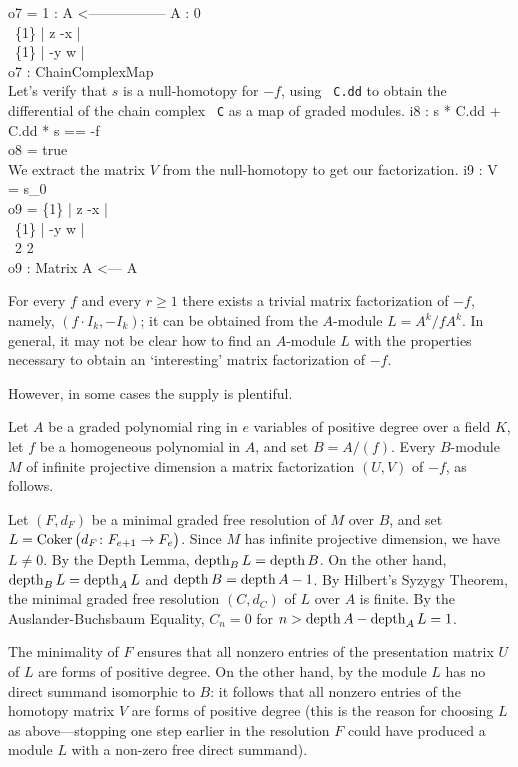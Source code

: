 \begin{Example}
o7 = 1 : A  <----------------- A  : 0\\
\               \{1\} | z  -x |\\
\               \{1\} | -y w  |\\
\emptyLine
o7 : ChainComplexMap\\
\endOutput
Let's verify that $s$ is a null-homotopy for $-f$, using {\tt
C.dd} to obtain the differential of the chain complex {\tt
C} as a map of graded modules.
\beginOutput
i8 : s * C.dd + C.dd * s == -f\\
\emptyLine
o8 = true\\
\endOutput
We extract the matrix $V$ from the null-homotopy to get our factorization.
\beginOutput
i9 : V = s_0\\
\emptyLine
o9 = \{1\} | z  -x |\\
\     \{1\} | -y w  |\\
\emptyLine
\             2       2\\
o9 : Matrix A  <--- A\\
\endOutput
\end{Example}

For every $f$ and every $r\ge1$ there exists a trivial matrix
factorization of $-f$, namely, $(f\cdot I_k, -I_k)$; it can be obtained
from the $A$-module $L=A^k/fA^k$.  In general, it may not be clear how
to find an $A$-module $L$ with the properties necessary to obtain an
`interesting' matrix factorization of $-f$.

However, in some cases the supply is plentiful.

\begin{Remark}
\label{factorization}
Let $A$ be a graded polynomial ring in $e$ variables of positive degree
over a field $K$, let $f$ be a homogeneous polynomial in $A$, and set
$B=A/(f)$.  Every $B$-module $M$ of infinite projective dimension
{\it{}\/} a matrix factorization $(U,V)$ of $-f$, as follows.

Let $(F,d_F)$ be a minimal graded free resolution of $M$ over $B$, and
set $L=\operatorname{Coker}\big(d_F\colon F_{e+1}\to F_e\big)$.  Since $M$ has
infinite projective dimension, we have $L\ne0$.  By the Depth Lemma,
$\operatorname{depth}_BL=\operatorname{depth} B$.  On the other hand, $\operatorname{depth}_BL=\operatorname{depth}_AL$ and
$\operatorname{depth} B=\operatorname{depth} A-1$.  By Hilbert's Syzygy Theorem, the minimal graded
free resolution $(C,d_C)$ of $L$ over $A$ is finite.  By the
Auslander-Buchsbaum Equality, $C_n=0$ for $n>\operatorname{depth} A-\operatorname{depth}_AL=1$.

The minimality of $F$ ensures that all nonzero entries of the
presentation matrix $U$ of $L$ are forms of positive degree.  On
the other hand, by \cite[Sect.~0]{CI:Ei} the module $L$ has no direct
summand isomorphic to $B$: it follows that all nonzero entries of
the homotopy matrix $V$ are forms of positive degree (this is the
reason for choosing $L$ as above---stopping one step earlier in the
resolution $F$ could have produced a module $L$ with a non-zero free
direct summand).
 \end{Remark}

